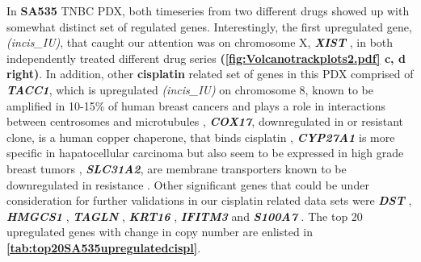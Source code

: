 In \textbf{SA535} TNBC PDX, both timeseries from two different drugs showed up with somewhat distinct set of regulated genes. Interestingly, the first upregulated gene, \textit{(incis\_IU)}, that caught our attention was on chromosome X, \textit{\textbf{XIST}} \cite{salama2020xist,chen2017long, chen2019up}, in both independently treated different drug series \textbf{(\autoref{fig:Volcanotrackplots2.pdf} c, d right)}. 
In addition, other \textbf{cisplatin} related set of genes in this PDX comprised of \textit{\textbf{TACC1}}, which is upregulated \textit{(incis\_IU)} on chromosome 8, known to be amplified in 10-15\% of human breast cancers and plays a role in interactions between centrosomes and microtubules \cite{ray2004genomic, gergely2000tacc, shakya2018high},
 \textit{\textbf{COX17}}, downregulated in or resistant clone, is a human copper chaperone, that binds cisplatin \cite{katano2002acquisition, zhao2014cisplatin}, \textit{\textbf{CYP27A1} }is more specific in hapatocellular carcinoma but also seem to be expressed in high grade breast tumors \cite{liang2019cyp27a1, wu201327}, \textit{\textbf{SLC31A2}}, are membrane transporters known to be downregulated in resistance \cite{bai2017structural}. Other significant genes that could be under consideration for further validations in our cisplatin related data sets were \textit{\textbf{DST} } \cite{salerno2016human,lee2012differentially}, \textit{\textbf{HMGCS1}} \cite{walsh2020mevalonate},
\textit{\textbf{TAGLN}} \cite{wu2014transgelin, elsafadi2020transgelin},
\textit{\textbf{KRT16}} \cite{huang2019novel},
\textit{\textbf{IFITM3}} \cite{liu2019ifitm3} and
\textit{\textbf{S100A7}} \cite{zhang2019clinical, mayama2018olfm}. The top 20 upregulated genes with change in copy number are enlisted in \textbf{\autoref{tab:top20SA535upregulatedcispl}}.


